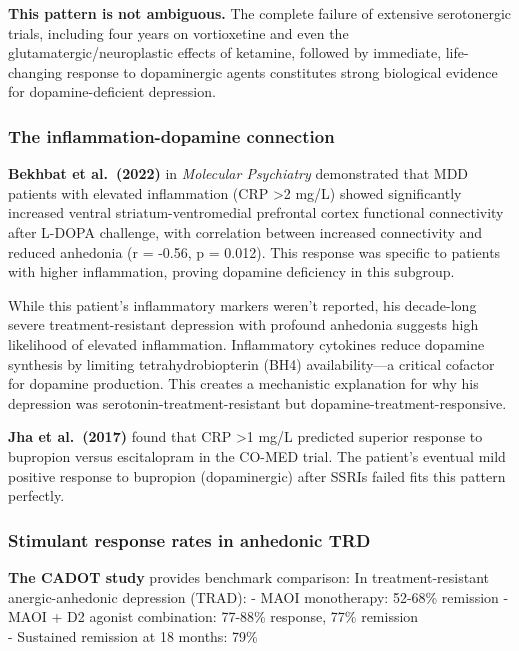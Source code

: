 \textbf{This pattern is not ambiguous.} The complete failure of extensive serotonergic trials, including four years on vortioxetine and even the glutamatergic/neuroplastic effects of ketamine, followed by immediate, life-changing response to dopaminergic agents constitutes strong biological evidence for dopamine-deficient depression.

\subsubsection{The inflammation-dopamine connection}\label{10a_trd_basis-the-inflammation-dopamine-connection}

\textbf{Bekhbat et al.~(2022)} in \emph{Molecular Psychiatry} demonstrated that MDD patients with elevated inflammation (CRP \textgreater2 mg/L) showed significantly increased ventral striatum-ventromedial prefrontal cortex functional connectivity after L-DOPA challenge, with correlation between increased connectivity and reduced anhedonia (r = -0.56, p = 0.012). This response was specific to patients with higher inflammation, proving dopamine deficiency in this subgroup.

While this patient's inflammatory markers weren't reported, his decade-long severe treatment-resistant depression with profound anhedonia suggests high likelihood of elevated inflammation. Inflammatory cytokines reduce dopamine synthesis by limiting tetrahydrobiopterin (BH4) availability---a critical cofactor for dopamine production. This creates a mechanistic explanation for why his depression was serotonin-treatment-resistant but dopamine-treatment-responsive.

\textbf{Jha et al.~(2017)} found that CRP \textgreater1 mg/L predicted superior response to bupropion versus escitalopram in the CO-MED trial. The patient's eventual mild positive response to bupropion (dopaminergic) after SSRIs failed fits this pattern perfectly.

\subsubsection{Stimulant response rates in anhedonic TRD}\label{10a_trd_basis-stimulant-response-rates-in-anhedonic-trd}

\textbf{The CADOT study} provides benchmark comparison: In treatment-resistant anergic-anhedonic depression (TRAD): - MAOI monotherapy: 52-68\% remission - MAOI + D2 agonist combination: 77-88\% response, 77\% remission\\
- Sustained remission at 18 months: 79\%

